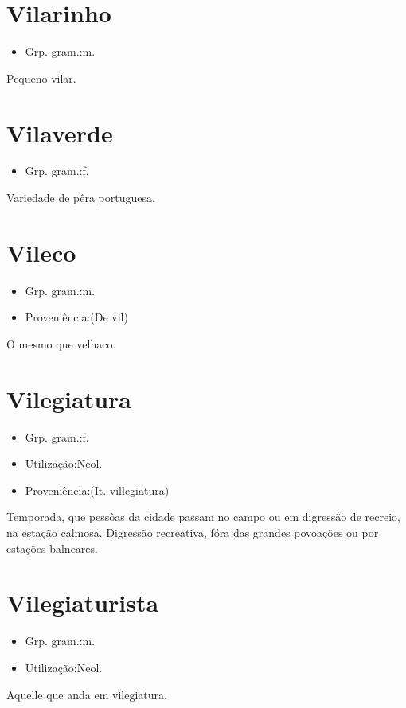 \documentclass{article}
\begin{document}
\section{Vilarinho}
\begin{itemize}
\item {Grp. gram.:m.}
\end{itemize}
Pequeno vilar.
\section{Vilaverde}
\begin{itemize}
\item {Grp. gram.:f.}
\end{itemize}
Variedade de pêra portuguesa.
\section{Vileco}
\begin{itemize}
\item {Grp. gram.:m.}
\end{itemize}
\begin{itemize}
\item {Proveniência:(De \textunderscore vil\textunderscore )}
\end{itemize}
O mesmo que \textunderscore velhaco\textunderscore .
\section{Vilegiatura}
\begin{itemize}
\item {Grp. gram.:f.}
\end{itemize}
\begin{itemize}
\item {Utilização:Neol.}
\end{itemize}
\begin{itemize}
\item {Proveniência:(It. \textunderscore villegiatura\textunderscore )}
\end{itemize}
Temporada, que pessôas da cidade passam no campo ou em digressão de recreio, na estação calmosa.
Digressão recreativa, fóra das grandes povoações ou por estações balneares.
\section{Vilegiaturista}
\begin{itemize}
\item {Grp. gram.:m.}
\end{itemize}
\begin{itemize}
\item {Utilização:Neol.}
\end{itemize}
Aquelle que anda em vilegiatura.
\end{document}
